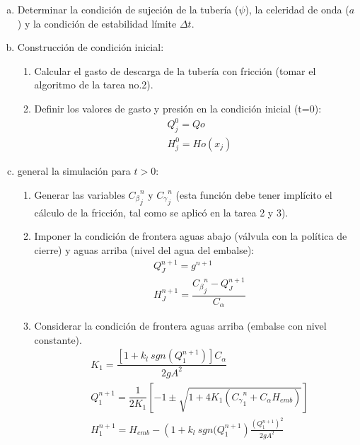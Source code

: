 \documentclass[letterpaper]{report}
\begin{document}
\begin{enumerate}[a)]
	\item Determinar la condición de sujeción de la tubería ($\psi$), la celeridad de onda ($a$) y la condición de estabilidad límite $\Delta t$.
	\item Construcción de condición inicial:
		\begin{enumerate}[1.]
			\item Calcular el gasto de descarga de la tubería con fricción (tomar el algoritmo de la tarea no.2).
			\item Definir los valores de gasto y presión en la condición inicial (t=0):\\
			\begin{equation*}
				\begin{aligned}
					&Q_j^0=Qo \\
					&H_j^0=Ho(x_j)
				\end{aligned}
			\end{equation*}
		\end{enumerate}
	\item general la simulación para $t>0$:
		\begin{enumerate}[1.]
		\item Generar las variables ${C_{\beta}}_j^n$ y ${C_\gamma}_j^n$ (esta función debe tener implícito el cálculo de la fricción, tal como se aplicó en la tarea 2 y 3).
		\item Imponer la condición de frontera aguas abajo (válvula con la política de cierre) y aguas arriba (nivel del agua del embalse):\\
			\begin{equation*}
				\begin{aligned}
					&Q_J^{n+1}=g^{n+1} \\
					&H_J^{n+1}=\dfrac{{C_\beta}_j^n-Q_J^{n+1}}{C_\alpha}
				\end{aligned}
			\end{equation*}
		\item Considerar la condición de frontera aguas arriba (embalse con nivel constante).
			\begin{equation*}
				\begin{aligned}
				&K_1=\dfrac{[1+k_l \ sgn(Q_1^{n+1})]C_\alpha}{2gA^2} \\
				&Q_1^{n+1}=\dfrac{1}{{2K}_1}\left[-1\pm\sqrt{1+{4K}_1\left({C_\gamma}_1^n+C_\alpha H_{emb}\right)}\right] \\
				&H_1^{n+1}=H_{emb}-\left(1+k_l \ sgn(Q_1^{n+1}\right)\frac{\left(Q_1^{n+1}\right)^2}{2gA^2}
				\end{aligned}
			\end{equation*}
		\end{enumerate}
\end{enumerate}
\end{document}
